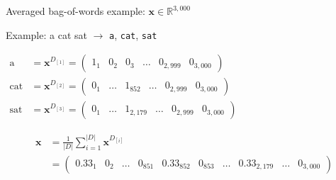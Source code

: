 \documentclass[12pt,aspectratio=169,handout]{beamer}
\begin{document}
\begin{frame}{Averaged bag-of-words example: $\bm{x} \in \mathbb{R}^{3,000}$}

\begin{block}{Example: a cat sat $\to$ \texttt{a}, \texttt{cat}, \texttt{sat}}

$
\begin{aligned}
	\text{a} & = \bm{x}^{D_{[1]}} =
	\begin{pmatrix}
		1_1 & 0_2 & 0_3 & \ldots & 0_{2,999} & 0_{3,000}
	\end{pmatrix} \\
	\text{cat} &= \bm{x}^{D_{[2]}} =
	\begin{pmatrix}
		0_1 & \ldots & 1_{852} & \ldots & 0_{2,999} & 0_{3,000}
	\end{pmatrix} \\
	\text{sat} &= \bm{x}^{D_{[3]}} =
	\begin{pmatrix}
		0_1 & \ldots & 1_{2,179} & \ldots & 0_{2,999} & 0_{3,000}
	\end{pmatrix}
\end{aligned}
$
	
\end{block}
$$
\begin{aligned}
\bm{x} &= \frac{1}{|D|} \sum_{i =1}^{|D|} \bm{x}^{D_{[i]}} \\
&= \begin{pmatrix}
	0.33_1 & 0_2 & \ldots & 0_{851} & 0.33_{852} & 0_{853} & \ldots & 0.33_{2,179} & \ldots & 0_{3,000}
\end{pmatrix}	
\end{aligned}
$$
	

		
\end{frame}
\end{document}
